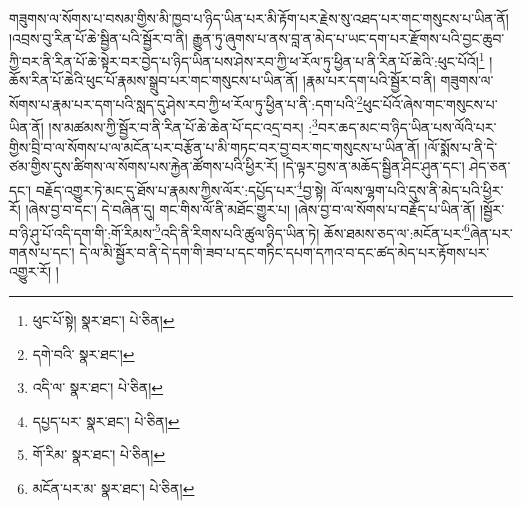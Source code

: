 གཟུགས་ལ་སོགས་པ་བསམ་གྱིས་མི་ཁྱབ་པ་ཉིད་ཡིན་པར་མི་རྟོག་པར་རྗེས་སུ་འཐད་པར་གང་གསུངས་པ་ཡིན་ནོ། །འབྲས་བུ་རིན་པོ་ཆེ་སྦྱིན་པའི་སྦྱོར་བ་ནི། རྒྱུན་ཏུ་ཞུགས་པ་ནས་བླ་ན་མེད་པ་ཡང་དག་པར་རྫོགས་པའི་བྱང་ཆུབ་ཀྱི་བར་ནི་རིན་པོ་ཆེ་སྟེར་བར་བྱེད་པ་ཉིད་ཡིན་པས་ཤེས་རབ་ཀྱི་ཕ་རོལ་ཏུ་ཕྱིན་པ་ནི་རིན་པོ་ཆེའི་:ཕུང་པོའོ།\footnote{ཕུང་པོ་སྟེ།  སྣར་ཐང་།  པེ་ཅིན། } །ཆོས་རིན་པོ་ཆེའི་ཕུང་པོ་རྣམས་སྒྲུབ་པར་གང་གསུངས་པ་ཡིན་ནོ། །རྣམ་པར་དག་པའི་སྦྱོར་བ་ནི། གཟུགས་ལ་སོགས་པ་རྣམ་པར་དག་པའི་སླད་དུ་ཤེས་རབ་ཀྱི་ཕ་རོལ་ཏུ་ཕྱིན་པ་ནི་:དག་པའི་\footnote{དགེ་བའི་  སྣར་ཐང་། }ཕུང་པོའོ་ཞེས་གང་གསུངས་པ་ཡིན་ནོ། །ས་མཚམས་ཀྱི་སྦྱོར་བ་ནི་རིན་པོ་ཆེ་ཆེན་པོ་དང་འདྲ་བར། :\footnote{འདི་ལ་  སྣར་ཐང་།  པེ་ཅིན། }བར་ཆད་མང་བ་ཉིད་ཡིན་པས་ལོའི་པར་གྱིས་བྲི་བ་ལ་སོགས་པ་ལ་མངོན་པར་བརྩོན་པ་མི་གཏང་བར་བྱ་བར་གང་གསུངས་པ་ཡིན་ནོ། །ལོ་སྨོས་པ་ནི་དེ་ཙམ་གྱིས་དུས་ཚིགས་ལ་སོགས་པས་རྐྱེན་ཚོགས་པའི་ཕྱིར་རོ། །དེ་ལྟར་བྱས་ན་མཆོད་སྦྱིན་ཤིང་ཤུན་དང་། ཤེད་ཅན་དང་། བརྗོད་འགྱུར་ཏེ་མང་དུ་ཐོས་པ་རྣམས་ཀྱིས་ལོར་:དཔྱོད་པར་\footnote{དཔྱད་པར་  སྣར་ཐང་།  པེ་ཅིན། }བྱ་སྟེ། ལོ་ལས་ལྷག་པའི་དུས་ནི་མེད་པའི་ཕྱིར་རོ། །ཞེས་བྱ་བ་དང་། དེ་བཞིན་དུ། གང་གིས་ལོ་ནི་མཐོང་གྱུར་པ། །ཞེས་བྱ་བ་ལ་སོགས་པ་བརྗོད་པ་ཡིན་ནོ། །སྦྱོར་བ་ཉི་ཤུ་པོ་འདི་དག་གི་:གོ་རིམས་\footnote{གོ་རིམ་  སྣར་ཐང་།  པེ་ཅིན། }འདི་ནི་རིགས་པའི་ཚུལ་ཉིད་ཡིན་ཏེ། ཆོས་ཐམས་ཅད་ལ་:མངོན་པར་\footnote{མངོན་པར་མ་  སྣར་ཐང་།  པེ་ཅིན། }ཞེན་པར་གནས་པ་དང་། དེ་ལ་མི་སྦྱོར་བ་ནི་དེ་དག་གི་ཟབ་པ་དང་གཏིང་དཔག་དཀའ་བ་དང་ཚད་མེད་པར་རྟོགས་པར་འགྱུར་རོ། །
